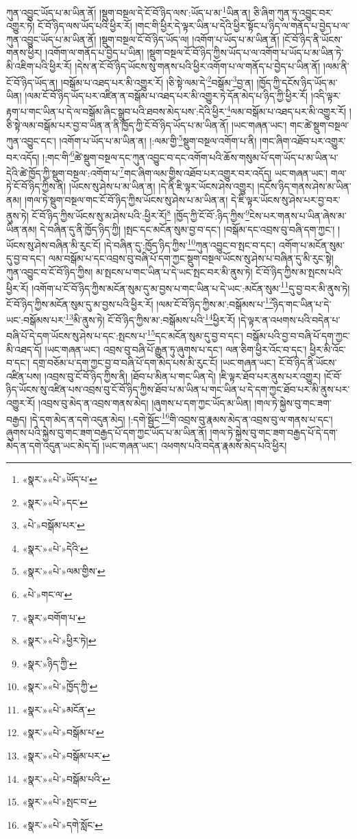 ཀུན་འབྱུང་ཡོད་པ་མ་ཡིན་ནོ། །སྡུག་བསྔལ་དེ་ངོ་བོ་ཉིད་ལས་:ཡོད་པ་མ་\footnote{«སྣར་»«པེ་»ཡོད་པ་}ཡིན་ན། ཅི་ཞིག་ཀུན་ཏུ་འབྱུང་བར་འགྱུར་ཏེ། ངོ་བོ་ཉིད་ལས་ཡོད་པའི་ཕྱིར་རོ། །གང་གི་ཕྱིར་དེ་ལྟར་ཡིན་པ་དེའི་ཕྱིར་སྟོང་པ་ཉིད་ལ་གནོད་པ་བྱེད་པ་ལ་ཀུན་འབྱུང་ཡོད་པ་མ་ཡིན་ནོ། །སྡུག་བསྔལ་ངོ་བོ་ཉིད་ཡོད་ལ། །འགོག་པ་ཡོད་པ་མ་ཡིན་ནོ། །ངོ་བོ་ཉིད་ནི་ཡོངས་གནས་ཕྱིར། །འགོག་ལ་གནོད་པ་བྱེད་པ་ཡིན། །སྡུག་བསྔལ་ངོ་བོ་ཉིད་ཀྱིས་ཡོད་པ་ལ་འགོག་པ་ཡོད་པ་མ་ཡིན་ཏེ་མི་འཇིག་པའི་ཕྱིར་རོ། །དེས་ན་ངོ་བོ་ཉིད་ཡོངས་སུ་གནས་པའི་ཕྱིར་འགོག་པ་ལ་གནོད་པ་བྱེད་པ་ཡིན་ནོ། །ལམ་ནི་ངོ་བོ་ཉིད་ཡོད་ན། །བསྒོམ་པ་འཐད་པར་མི་འགྱུར་རོ། །ཅི་སྟེ་ལམ་དེ་\footnote{«སྣར་»«པེ་»དང་}བསྒོམ་\footnote{«པེ་»བསྒོམ་པར་}བྱ་ན། །ཁྱོད་ཀྱི་དངོས་ཉིད་ཡོད་མ་ཡིན། །ལམ་ངོ་བོ་ཉིད་ཡོད་པར་འཛིན་ན་བསྒོམ་པ་འཐད་པར་མི་འགྱུར་ཏེ་དོན་མེད་པ་ཉིད་ཀྱི་ཕྱིར་རོ། །འདི་ལྟར་རྟག་པ་གང་ཡིན་པ་དེ་ལ་བསྒོམ་ཞིང་སྒྲུབ་པའི་ཐབས་མེད་པས་:དེའི་ཕྱིར་\footnote{«སྣར་»«པེ་»དེའི་}ལམ་བསྒོམ་པ་འཐད་པར་མི་འགྱུར་རོ། །ཅི་སྟེ་ལམ་བསྒོམ་པར་བྱ་བ་ཡིན་ན་ནི་ཁྱོད་ཀྱི་ངོ་བོ་ཉིད་ཡོད་པ་མ་ཡིན་ནོ། །ཡང་གཞན་ཡང་། གང་ཚེ་སྡུག་བསྔལ་ཀུན་འབྱུང་དང་། །འགོག་པ་ཡོད་པ་མ་ཡིན་ན། །:ལམ་གྱི་\footnote{«སྣར་»«པེ་»ལམ་གྱིས་}སྡུག་བསྔལ་འགོག་པ་ནི། །གང་ཞིག་འཐོབ་པར་འགྱུར་བར་འདོད། །:གང་གི་\footnote{«པེ་»གང་ལ་}ཚེ་སྡུག་བསྔལ་དང་ཀུན་འབྱུང་བ་དང་འགོག་པའི་ཆོས་གསུམ་པོ་དག་ཡོད་པ་མ་ཡིན་པ་དེའི་ཚེ་ཁྱོད་ཀྱི་སྡུག་བསྔལ་:འགོག་པ་\footnote{«སྣར་»བགོག་པ་}གང་ཞིག་ལམ་གྱིས་འཐོབ་པར་འགྱུར་བར་འདོད། ཡང་གཞན་ཡང་། གལ་ཏེ་ངོ་བོ་ཉིད་ཀྱིས་ནི། །ཡོངས་སུ་ཤེས་པ་མ་ཡིན་ན། །དེ་ནི་ཇི་ལྟར་ཡོངས་ཤེས་འགྱུར། །དངོས་ཉིད་གནས་ཤེས་མ་ཡིན་ནམ། །གལ་ཏེ་སྡུག་བསྔལ་གང་ངོ་བོ་ཉིད་ཀྱིས་ཡོངས་སུ་ཤེས་པ་མ་ཡིན་ན། དེ་ཇི་ལྟར་ཡོངས་སུ་ཤེས་པར་བྱ་བར་ནུས་ཏེ། ངོ་བོ་ཉིད་ཀྱིས་ཡོངས་སུ་མ་ཤེས་པའི་:ཕྱིར་རོ།\footnote{«སྣར་»«པེ་»ཕྱིར་ཏེ།} །ཁྱོད་ཀྱི་ངོ་བོ་:ཉིད་ཀྱིས་\footnote{«སྣར་»ཉིད་ཀྱི་}ངེས་པར་གནས་པ་ཡིན་ཞེས་མ་ཡིན་ནམ། དེ་བཞིན་དུ་ནི་ཁྱོད་ཉིད་ཀྱི། །སྤང་དང་མངོན་སུམ་བྱ་བ་དང་། །བསྒོམ་དང་འབྲས་བུ་བཞི་དག་ཀྱང་། །ཡོངས་སུ་ཤེས་བཞིན་མི་རུང་ངོ། །དེ་བཞིན་དུ་:ཁྱོད་ཉིད་ཀྱིས་\footnote{«སྣར་»«པེ་»ཁྱོད་ཀྱི་}ཀུན་འབྱུང་བ་སྤང་བ་དང་། འགོག་པ་མངོན་སུམ་དུ་བྱ་བ་དང་། ལམ་བསྒོམ་པ་དང་འབྲས་བུ་བཞི་པོ་དག་ཀྱང་སྡུག་བསྔལ་ཡོངས་སུ་ཤེས་པ་བཞིན་དུ་མི་རུང་སྟེ། ཀུན་འབྱུང་བ་ངོ་བོ་ཉིད་ཀྱིས། མ་སྤངས་པ་གང་ཡིན་པ་དེ་ཡང་སྤང་བར་མི་ནུས་ཏེ། ངོ་བོ་ཉིད་ཀྱིས་མ་སྤངས་པའི་ཕྱིར་རོ། །འགོག་པ་ངོ་བོ་ཉིད་ཀྱིས་མངོན་སུམ་དུ་མ་བྱས་པ་གང་ཡིན་པ་དེ་ཡང་:མངོན་སུམ་\footnote{«སྣར་»«པེ་»མངོན་}དུ་བྱ་བར་མི་ནུས་ཏེ། ངོ་བོ་ཉིད་ཀྱིས་མངོན་སུམ་དུ་མ་བྱས་པའི་ཕྱིར་རོ། །ལམ་ངོ་བོ་ཉིད་ཀྱིས་མ་:བསྒོམས་པ་\footnote{«སྣར་»«པེ་»བསྒོམ་པ་}ཉིད་གང་ཡིན་པ་དེ་ཡང་:བསྒོམས་པར་\footnote{«སྣར་»«པེ་»བསྒོམ་པར་}མི་ནུས་ཏེ། ངོ་བོ་ཉིད་ཀྱིས་མ་:བསྒོམས་པའི་\footnote{«སྣར་»«པེ་»བསྒོམ་པའི་}ཕྱིར་རོ། །དེ་ལྟར་ན་འཕགས་པའི་བདེན་པ་བཞི་པོ་དེ་དག་ཡོངས་སུ་ཤེས་པ་དང་:སྤངས་པ་\footnote{«སྣར་»«པེ་»སྤང་བ་}དང་མངོན་སུམ་དུ་བྱ་བ་དང་། བསྒོམ་པའི་བྱ་བ་བཞི་པོ་དག་ཀྱང་མི་འཐད་དོ། །ཡང་གཞན་ཡང་། འབྲས་བུ་བཞི་པོ་རྒྱུན་ཏུ་ཞུགས་པ་དང་། ལན་ཅིག་ཕྱིར་འོང་བ་དང་། ཕྱིར་མི་འོང་བ་དང་། དགྲ་བཅོམ་པ་དག་ཀྱང་བྱ་བ་བཞི་པོ་དག་མེད་པས་མི་རུང་ངོ། །ཡང་གཞན་ཡང་། ངོ་བོ་ཉིད་ནི་ཡོངས་འཛིན་པས། །འབྲས་བུ་ངོ་བོ་ཉིད་ཀྱིས་ནི། །ཐོབ་པ་མིན་པ་གང་ཡིན་དེ། །ཇི་ལྟར་ཐོབ་པར་ནུས་པར་འགྱུར། །ངོ་བོ་ཉིད་ཡོངས་སུ་འཛིན་པས་འབྲས་བུ་ངོ་བོ་ཉིད་ཀྱིས་ཐོབ་པ་མ་ཡིན་པ་གང་ཡིན་པ་དེ་དག་ཀྱང་ཐོབ་པར་མི་ནུས་པར་འགྱུར་རོ། །འབྲས་བུ་མེད་ན་འབྲས་གནས་མེད། །ཞུགས་པ་དག་ཀྱང་ཡོད་མ་ཡིན། །གལ་ཏེ་སྐྱེས་བུ་གང་ཟག་བརྒྱད། །དེ་དག་མེད་ན་དགེ་འདུན་མེད། །:དགེ་སྦྱོང་\footnote{«སྣར་»«པེ་»དགེ་སློང་}གི་འབྲས་བུ་རྣམས་མེད་ན་འབྲས་བུ་ལ་གནས་པ་དང་། ཞུགས་པའི་སྐྱེས་བུ་གང་ཟག་བརྒྱད་པོ་དག་ཀྱང་ཡོད་པ་མ་ཡིན་ནོ། །གལ་ཏེ་སྐྱེས་བུ་གང་ཟག་བརྒྱད་པོ་དེ་དག་མེད་ན་དགེ་འདུན་ཡང་མེད་དོ། །ཡང་གཞན་ཡང་། འཕགས་པའི་བདེན་རྣམས་མེད་པའི་ཕྱིར། 